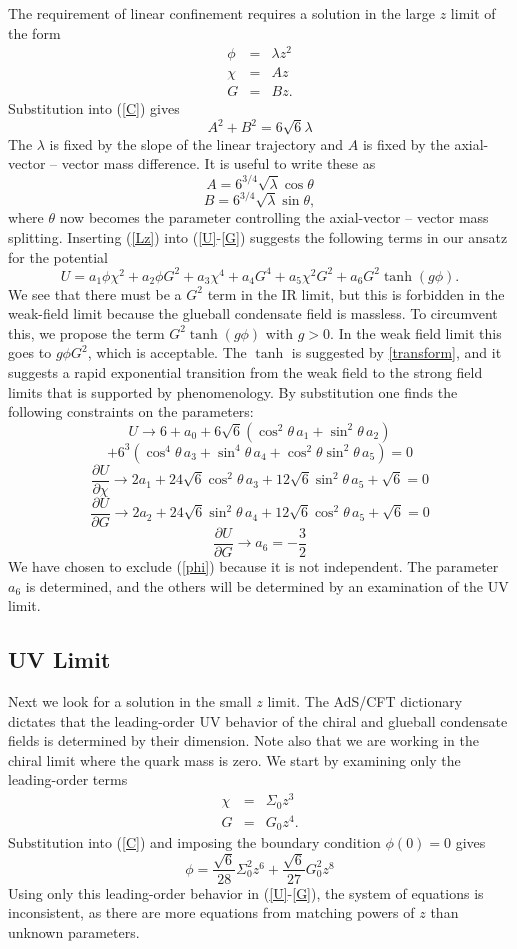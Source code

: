 \documentclass[aps,prd,12pt,nofootinbib]{revtex4}
\newcommand{\be}{\begin{equation}}
\newcommand{\ee}{\end{equation}}
\newcommand{\ba}{\begin{eqnarray}}
\newcommand{\ea}{\end{eqnarray}}
\newcommand{\bd}{\begin{displaymath}}
\newcommand{\ed}{\end{displaymath}}
\def\tthalf{{\textstyle{\frac{3}{2}}}}
\def\rt6{\sqrt{6}}
\begin{document}
The requirement of linear confinement requires a solution in the large $z$ limit of the  form
\ba
\phi &=& \lambda z^2 \\
\chi &=& Az \\
G &=& B z.
\label{Lz}
\ea
Substitution into (\ref{C}) gives
\be
A^2 + B^2 = 6\rt6 \lambda
\label{Clarge}
\ee
The $\lambda$ is fixed by the slope of the linear trajectory and $A$ is fixed by the axial-vector -- vector mass difference.  
It is useful to write these as
\bd
A = 6^{3/4} \sqrt{\lambda} \cos\theta
\ed
\be
B = 6^{3/4} \sqrt{\lambda} \sin\theta,
\ee
where $\theta$ now becomes the parameter controlling the axial-vector -- vector mass splitting.
Inserting (\ref{Lz}) into (\ref{U}-\ref{G}) suggests the following terms in our ansatz for the potential
\be
U =  a_1 \phi \chi^2 + a_2 \phi G^2 + a_3 \chi^4 + a_4 G^4 + a_5 \chi^2 G^2 
+ a_6 G^2 \tanh(g\phi).
\ee
We see that there must be a $G^2$ term in the IR limit, but this is forbidden in the weak-field limit because the glueball condensate field is massless. 
To circumvent this, we propose the term $G^2 \tanh(g\phi)$ with $g>0$.  
In the weak field limit this goes to $g\phi G^2$, which is acceptable.  
The $\tanh$ is suggested by \ref{transform}, and it suggests a rapid exponential transition from the weak field to the strong field limits that is supported by phenomenology.
By substitution one finds the following constraints on the parameters:
\bd
U \rightarrow 6 + a_0 + 6\rt6 \left( \cos^2 \theta \, a_1 + \sin^2 \theta \, a_2 \right)
\ed
\be
+ 6^3 \left( \cos^4 \theta \, a_3 + \sin^4 \theta \, a_4 + \cos^2 \theta \sin^2 \theta \, a_5 \right) = 0
\ee
\be
\frac{\partial U}{\partial \chi} \rightarrow
2a_1 + 24\rt6 \cos^2\theta \, a_3 + 12\rt6 \sin^2\theta \, a_5 + \rt6 = 0
\ee
\be
\frac{\partial U}{\partial G} \rightarrow
2a_2 + 24\rt6 \sin^2\theta \, a_4 + 12\rt6 \cos^2\theta \, a_5 + \rt6 = 0
\ee
\be
\frac{\partial U}{\partial G} \rightarrow
a_6 = - \tthalf \label{LargeZ2}
\ee
We have chosen to exclude (\ref{phi}) because it is not independent. 
The parameter $a_6$ is determined, and the others will be determined by an examination of the UV limit.

\subsection{UV Limit}

Next we look for a solution in the small $z$ limit. 
The AdS/CFT dictionary dictates that the leading-order UV behavior of the chiral and glueball condensate fields is determined by their dimension. 
Note also that we are working in the chiral limit where the quark mass is zero. 
We start by examining only the leading-order terms
\ba
\chi &=& \Sigma_0 z^3 \\
G &=& G_0 z^4.
\ea
Substitution into (\ref{C}) and imposing the boundary condition $\phi(0)=0$ gives
\be
\phi = \frac{\rt6}{28} \Sigma_0^2 z^6 + \frac{\rt6}{27} G_0^2 z^8
\label{Sz}
\ee
Using only this leading-order behavior in (\ref{U}-\ref{G}), the system of equations is inconsistent, as there are more equations from matching powers of $z$ than unknown parameters. 
\end{document}
